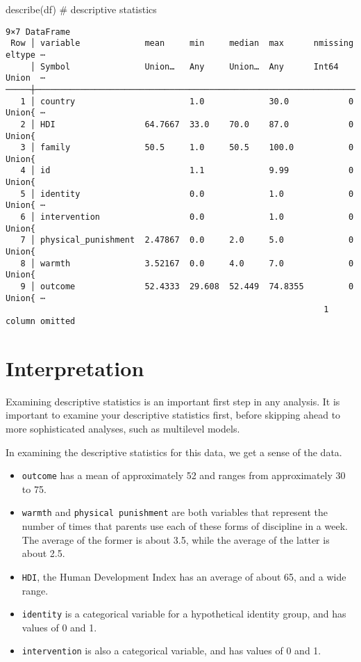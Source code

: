 \documentclass[
  letterpaper,
  DIV=11,
  numbers=noendperiod]{scrreprt}
\newenvironment{Shaded}{\begin{snugshade}}{\end{snugshade}}
\newcommand{\CommentTok}[1]{\textcolor[rgb]{0.37,0.37,0.37}{#1}}
\newcommand{\FunctionTok}[1]{\textcolor[rgb]{0.28,0.35,0.67}{#1}}
\newcommand{\NormalTok}[1]{\textcolor[rgb]{0.00,0.23,0.31}{#1}}
\providecommand{\tightlist}{%
  \setlength{\itemsep}{0pt}\setlength{\parskip}{0pt}}\usepackage{longtable,booktabs,array}
\begin{document}
\begin{Shaded}
\begin{Highlighting}[]

\FunctionTok{describe}\NormalTok{(df) }\CommentTok{\# descriptive statistics}
\end{Highlighting}
\end{Shaded}

\begin{verbatim}
9×7 DataFrame
 Row │ variable             mean     min     median  max      nmissing  eltype ⋯
     │ Symbol               Union…   Any     Union…  Any      Int64     Union  ⋯
─────┼──────────────────────────────────────────────────────────────────────────
   1 │ country                       1.0             30.0            0  Union{ ⋯
   2 │ HDI                  64.7667  33.0    70.0    87.0            0  Union{
   3 │ family               50.5     1.0     50.5    100.0           0  Union{
   4 │ id                            1.1             9.99            0  Union{
   5 │ identity                      0.0             1.0             0  Union{ ⋯
   6 │ intervention                  0.0             1.0             0  Union{
   7 │ physical_punishment  2.47867  0.0     2.0     5.0             0  Union{
   8 │ warmth               3.52167  0.0     4.0     7.0             0  Union{
   9 │ outcome              52.4333  29.608  52.449  74.8355         0  Union{ ⋯
                                                                1 column omitted
\end{verbatim}

\section{Interpretation}\label{interpretation}

Examining descriptive statistics is an important first step in any
analysis. It is important to examine your descriptive statistics first,
before skipping ahead to more sophisticated analyses, such as multilevel
models.

In examining the descriptive statistics for this data, we get a sense of
the data.

\begin{itemize}
\tightlist
\item
  \texttt{outcome} has a mean of approximately 52 and ranges from
  approximately 30 to 75.
\item
  \texttt{warmth} and \texttt{physical\ punishment} are both variables
  that represent the number of times that parents use each of these
  forms of discipline in a week. The average of the former is about 3.5,
  while the average of the latter is about 2.5.
\item
  \texttt{HDI}, the Human Development Index has an average of about 65,
  and a wide range.
\item
  \texttt{identity} is a categorical variable for a hypothetical
  identity group, and has values of 0 and 1.
\item
  \texttt{intervention} is also a categorical variable, and has values
  of 0 and 1.
\end{itemize}
\end{document}
